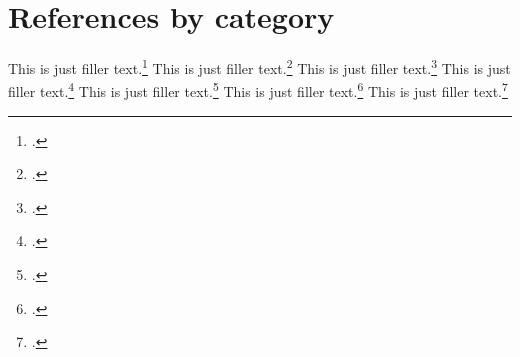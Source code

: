 \documentclass[a4paper,oneside]{book}
\begin{document}
\chapter{References by category}

This is just filler text.\footcite{aristotle:anima}
This is just filler text.\footcite{nussbaum}
This is just filler text.\footcite{averroes/bland}
This is just filler text.\footcite{hyman}
This is just filler text.\footcite{aristotle:physics}
This is just filler text.\footcite{moraux}
This is just filler text.\footcite{pines}

\printbibheading
\bibbycategory
%
%
\end{document}
